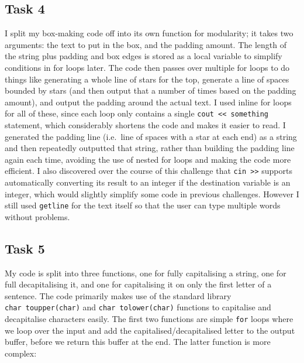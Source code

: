 \documentclass[
]{article}
\begin{document}
\subsection{Task 4}\label{task-4}

I split my box-making code off into its own function for modularity; it
takes two arguments: the text to put in the box, and the padding amount.
The length of the string plus padding and box edges is stored as a local
variable to simplify conditions in for loops later. The code then passes
over multiple for loops to do things like generating a whole line of
stars for the top, generate a line of spaces bounded by stars (and then
output that a number of times based on the padding amount), and output
the padding around the actual text. I used inline for loops for all of
these, since each loop only contains a single
\texttt{cout\ \textless{}\textless{}\ something} statement, which
considerably shortens the code and makes it easier to read. I generated
the padding line (i.e.~line of spaces with a star at each end) as a
string and then repeatedly outputted that string, rather than building
the padding line again each time, avoiding the use of nested for loops
and making the code more efficient. I also discovered over the course of
this challenge that \texttt{cin\ \textgreater{}\textgreater{}} supports
automatically converting its result to an integer if the destination
variable is an integer, which would slightly simplify some code in
previous challenges. However I still used \texttt{getline} for the text
itself so that the user can type multiple words without problems.

\subsection{Task 5}\label{task-5}

My code is split into three functions, one for fully capitalising a
string, one for full decapitalising it, and one for capitalising it on
only the first letter of a sentence. The code primarily makes use of the
standard library \texttt{char\ toupper(char)} and
\texttt{char\ tolower(char)} functions to capitalise and decapitalise
characters easily. The first two functions are simple \texttt{for} loops
where we loop over the input and add the capitalised/decapitalised
letter to the output buffer, before we return this buffer at the end.
The latter function is more complex:
\end{document}
